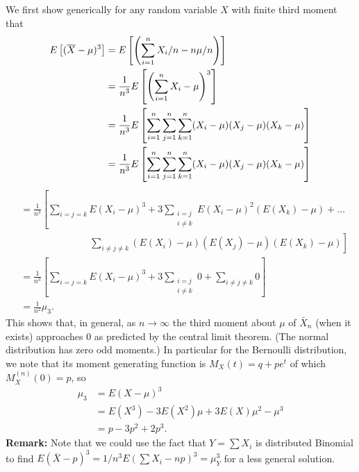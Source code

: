 \documentclass{stat_homework}
\begin{document}
\begin{solution}
  We first show generically for any random variable $X$ with finite third moment that
  \begin{align*}
  E\left[ (\overline X - \mu)^3 \right] 
  &= E\left[ \left(\sum_{i=1}^n X_i/n - n \mu/ n \right) \right]\\
  &= \frac 1{n^3} E\left[ \left(\sum_{i=1}^n X_i - \mu \right)^3 \right]\\
  &= \frac 1{n^3} E\left[  \sum_{i=1}^n\sum_{j=1}^n\sum_{k=1}^n (X_i - \mu)(X_j - \mu)(X_k - \mu) \right] \\
  &= \frac 1{n^3} E\left[  \sum_{i=1}^n\sum_{j=1}^n\sum_{k=1}^n (X_i - \mu)(X_j - \mu)(X_k - \mu) \right] \\
  \end{align*}
  \begin{align*}
  &= \frac 1{n^3} \left[\sum_{i=j=k} E(X_i - \mu)^3 + 3 \sum_{\substack{i=j\\i\not=k}} E(X_i - \mu)^2(E(X_k) - \mu) +\dots\right.\\
  &\left.\hspace{3cm} \sum_{i\not=j\not=k} (E(X_i) - \mu)(E(X_j) - \mu)(E(X_k) - \mu)\right]\\
  &= \frac 1{n^3}\left[\sum_{i=j=k} E(X_i - \mu)^3 + 3 \sum_{\substack{i=j\\i\not=k}} 0 + \sum_{i\not=j\not=k} 0\right]\\
  &= \frac 1{n^2} \mu_3. 
  \end{align*}
  This shows that, in general, as $n\to \infty$ the third moment about $\mu$ of $\bar X_n$ (when it exists) approaches 0 as predicted by the central limit theorem. (The normal distribution has zero odd moments.)  In particular for the Bernoulli distribution, we note that its moment generating function is $M_X(t) = q + pe^t$ of which $M_X^{(n)}(0) = p$, so 
  \begin{align*}
  \mu_3 &= E(X-\mu)^3 \\
  &= E\left(X^3\right) - 3E\left(X^2\right)\mu + 3E(X) \mu^2 - \mu^3  \\
  &= p - 3p^2 + 2p^3. 
  \end{align*}
  \textbf{Remark:} Note that we could use the fact that $Y = \sum X_i$ is distributed Binomial to find $E(\bar X - p)^3 = 1/n^3 E(\sum X_i - np)^3 = \mu_Y^3$ for a less general solution. 
\end{solution}
\end{document}
